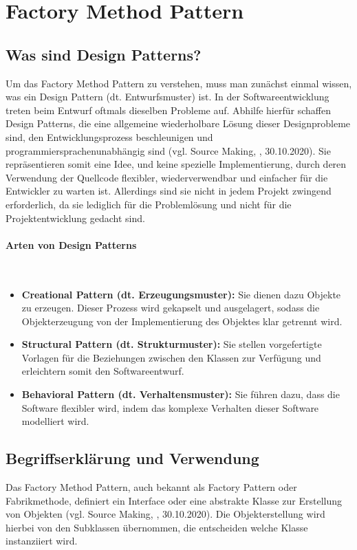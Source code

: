 \section{Factory Method Pattern}
\subsection{Was sind Design Patterns?}
Um das Factory Method Pattern zu verstehen, muss man zunächst einmal wissen, was ein Design Pattern (dt. Entwurfsmuster) ist. In der Softwareentwicklung treten beim Entwurf oftmals dieselben Probleme auf. Abhilfe hierfür schaffen Design Patterns, die eine allgemeine wiederholbare Lösung dieser Designprobleme sind, den Entwicklungsprozess beschleunigen und programmiersprachenunabhängig sind (vgl. Source Making, \cite{design_pattern_2020}, 30.10.2020). Sie repräsentieren somit eine Idee, und keine spezielle Implementierung, durch deren Verwendung der Quellcode flexibler, wiederverwendbar und einfacher für die Entwickler zu warten ist. Allerdings sind sie nicht in jedem Projekt zwingend erforderlich, da sie lediglich für die Problemlösung und nicht für die Projektentwicklung gedacht sind.

\paragraph{Arten von Design Patterns}\mbox{}\\

\begin{itemize}
	\item \textbf{Creational Pattern (dt. Erzeugungsmuster):} Sie dienen dazu Objekte zu erzeugen. Dieser Prozess wird gekapselt und ausgelagert, sodass die Objekterzeugung von der Implementierung des Objektes klar getrennt wird.
	\item \textbf{Structural Pattern (dt. Strukturmuster):} Sie stellen vorgefertigte Vorlagen für die Beziehungen zwischen den Klassen zur Verfügung und erleichtern somit den Softwareentwurf.
	\item \textbf{Behavioral Pattern (dt. Verhaltensmuster):} Sie führen dazu, dass die Software flexibler wird, indem das komplexe Verhalten dieser Software modelliert wird.
\end{itemize}

\subsection{Begriffserklärung und Verwendung}
Das Factory Method Pattern, auch bekannt als Factory Pattern oder Fabrikmethode, definiert ein Interface oder eine abstrakte Klasse zur Erstellung von Objekten (vgl. Source Making, \cite{factory_method_2020}, 30.10.2020). Die Objekterstellung wird hierbei von den Subklassen übernommen, die entscheiden welche Klasse instanziiert wird.

